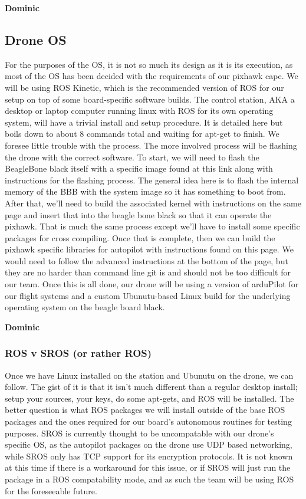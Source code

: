 \documentclass[IEEEtran,letterpaper,10pt,notitlepage,draftclsnofoot,onecolumn]{article}
\begin{document}
\textbf{Dominic}

\subsection{Drone OS}
For the purposes of the OS, it is not so much its design as it is its execution, as most of the OS has been decided with
the requirements of our pixhawk cape. We will be using ROS Kinetic, which is the recommended version of ROS for our setup on top 
of some board-specific software builds. The control station, AKA a desktop or laptop computer running linux with ROS for its own
operating system, will have a trivial install and setup procedure. It is detailed here\cite{Indigo} but boils down to about 8
commands total and waiting for apt-get to finish. We foresee little trouble with the process. The more involved process will be
flashing the drone with the correct software. To start, we will need to flash the BeagleBone black itself with a specific image
found at this link along with instructions for the flashing process\cite{buildingBBB}. The general idea here is to flash the internal
memory of the BBB with the system image so it has something to boot from. After that, we'll need to build the associated kernel
with instructions on the same page and insert that into the beagle bone black so that it can operate the pixhawk. That is much
the same process except we'll have to install some specific packages for cross compiling. Once that is complete, then we can
build the pixhawk specific libraries for autopilot with instructions found on this page\cite{buildingPX}. We would need to
follow the advanced instructions at the bottom of the page, but they are no harder than command line git is and should not be
too difficult for our team. Once this is all done, our drone will be using a version of arduPilot for our flight systems and a
custom Ubunutu-based Linux build for the underlying operating system on the beagle board black.

\textbf{Dominic}

\subsubsection{ROS v SROS (or rather ROS)}
Once we have Linux installed on the station and Ubunutu on the drone, we can follow\cite{Indigo}.
The gist of it is that it isn't much different than a regular desktop install; setup your sources, your keys, do some
apt-gets, and ROS will be installed. The better question is what ROS packages we will install outside of the base ROS packages
and the ones required for our board's autonomous routines for testing purposes. SROS is currently thought to be uncompatable with
our drone's specific OS, as the autopilot packages on the drone use UDP based networking, while SROS only has TCP support for
its encryption protocols. It is not known at this time if there is a workaround for this issue, or if SROS will just run the
package in a ROS compatability mode, and as such the team will be using ROS for the foreseeable future.
\end{document}
